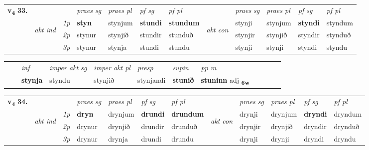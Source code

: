 \begin{tabular}{llllllllllll} \toprule
\multirow{4}{*}{{{\textbf{v{\textsubscript{4}}} \Large{\textbf{33.}}}}}  & &   &  \textit{praes sg}  & \textit{praes pl}  &\textit{ pf sg} & \textit{pf pl} &  &  \textit{praes sg}  & \textit{praes pl}  & \textit{pf sg} & \textit{pf pl } \\*
	\cmidrule{4-7} \cmidrule{9-12}
 & \multirow{3}{*}{\begin{turn}{90}\textit{akt ind}\end{turn}} & {\textit{1p}} & \textbf{styn} & stynjum    & \textbf{stundi} & \textbf{stundum} & \multirow{3}{*}{\begin{turn}{90}\textit{akt con}\end{turn}} &stynji & stynjum & \textbf{styndi} & styndum\\*
& &  {\textit{2p}} &  stynur  & stynjið   & stundir & stunduð & & stynjir & stynjið & styndir & stynduð \\*
& &  {\textit{3p}} & stynur & stynja   & stundi & stundu & & stynji & stynji& styndi & styndu  \\*
\cmidrule{4-7} \cmidrule{9-12}
\end{tabular}


\begin{tabular}{llllllllllll}
 & & \textit{inf} & \textit{imper akt sg} & \textit{imper akt pl}   & \textit{presp} & \textit{supin}  & \textit{pp m}     \\*
  & & \textbf{stynja} & styndu  & stynjið   & stynjandi &  \textbf{stunið}  & \textbf{stuninn} adj \textbf{\textsubscript{6w}} \\*
\cmidrule{1-12}
\end{tabular}



\begin{tabular}{llllllllllll} \toprule
\multirow{4}{*}{{{\textbf{v{\textsubscript{4}}} \Large{\textbf{34.}}}}}  & &   &  \textit{praes sg}  & \textit{praes pl}  &\textit{ pf sg} & \textit{pf pl} &  &  \textit{praes sg}  & \textit{praes pl}  & \textit{pf sg} & \textit{pf pl } \\*
	\cmidrule{4-7} \cmidrule{9-12}
 & \multirow{3}{*}{\begin{turn}{90}\textit{akt ind}\end{turn}} & {\textit{1p}} & \textbf{dryn} & drynjum    & \textbf{drundi} & \textbf{drundum} & \multirow{3}{*}{\begin{turn}{90}\textit{akt con}\end{turn}} &drynji & drynjum & \textbf{dryndi} & dryndum\\*
& &  {\textit{2p}} &  drynur  & drynjið   & drundir & drunduð & & drynjir & drynjið & dryndir & drynduð \\*
& &  {\textit{3p}} & drynur & drynja   & drundi & drundu & & drynji & drynji& dryndi & dryndu  \\*
\cmidrule{4-7} \cmidrule{9-12}
\end{tabular}


